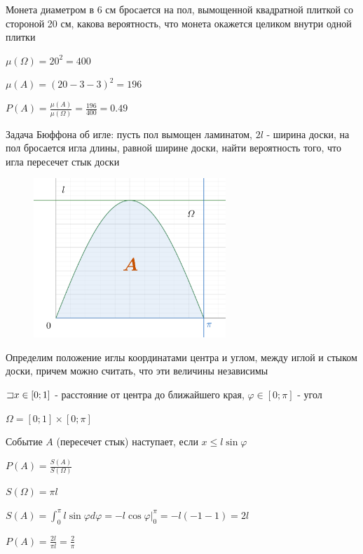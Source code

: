 \documentclass[12pt]{article}
\begin{document}
     Монета диаметром в 6 см бросается на пол, вымощенной квадратной плиткой со стороной 20 см, какова вероятность,
    что монета окажется целиком внутри одной плитки

    $\mu(\Omega) = 20^2 = 400$

    $\mu(A) = (20 - 3 - 3)^2 = 196$

    $P(A) = \frac{\mu(A)}{\mu(\Omega)} = \frac{196}{400} = 0.49$

    \hypertarget{buffonsproblem}{}

     Задача Бюффона об игле: пусть пол вымощен ламинатом, $2l$ - ширина доски, на пол бросается игла длины, равной ширине доски,
    найти вероятность того, что игла пересечет стык доски

    \smallvspace

    \begin{minipage}{\linewidth}
        \begin{figure}
            \includegraphics[height=6cm]{probtheory/images/probtheory_2024_09_03_1}
        \end{figure}

        Определим положение иглы координатами центра и углом, между иглой и стыком доски, причем можно считать, что эти величины независимы

        $\mathord{\sqsupset} x \in [0; 1]$ - расстояние от центра до ближайшего края, $\varphi \in [0; \pi]$ - угол

        $\Omega = [0; 1] \times [0; \pi]$

        Событие $A$ (пересечет стык) наступает, если $x \leq l \sin \varphi$

        $P(A) = \frac{S(A)}{S(\Omega)}$

        $S(\Omega) = \pi l$

        $S(A) = \int_0^\pi l \sin \varphi d\varphi = -l \cos \varphi \Big|_0^\pi = -l (-1 - 1) = 2l$

        $P(A) = \frac{2l}{\pi l} = \frac{2}{\pi}$
    \end{minipage}
\end{document}
